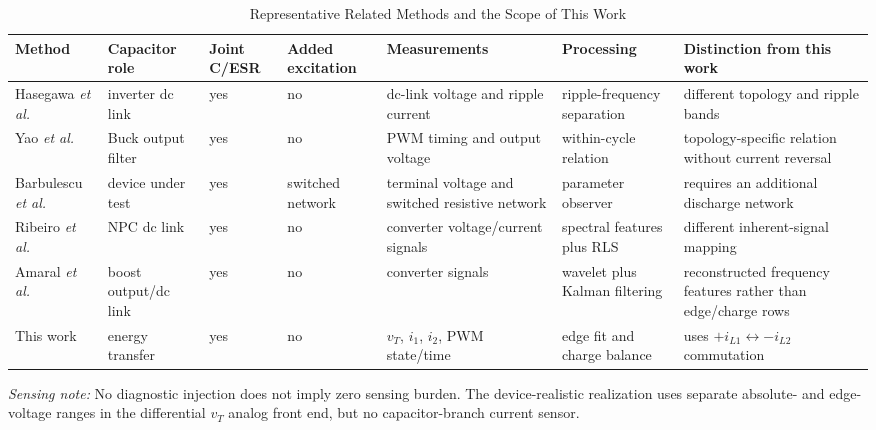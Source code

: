 \begin{table}[t]
\caption{Representative Related Methods and the Scope of This Work}
\label{tab:related_work}
\centering
\footnotesize
\setlength{\tabcolsep}{3pt}
\begin{tabular}{p{2.15cm}p{1.45cm}p{1.0cm}p{1.55cm}p{2.45cm}p{1.95cm}p{4.55cm}}
\toprule
Method & Capacitor role & Joint C/ESR & Added excitation & Measurements & Processing & Distinction from this work \\
\midrule
Hasegawa \emph{et al.} \cite{hasegawa2018dclink} & inverter dc link & yes & no & dc-link voltage and ripple current & ripple-frequency separation & different topology and ripple bands \\ \addlinespace[1pt]
Yao \emph{et al.} \cite{yao2015buck} & Buck output filter & yes & no & PWM timing and output voltage & within-cycle relation & topology-specific relation without \Cuk{} current reversal \\ \addlinespace[1pt]
Barbulescu \emph{et al.} \cite{barbulescu2022observer} & device under test & yes & switched network & terminal voltage and switched resistive network & parameter observer & requires an additional discharge network \\ \addlinespace[1pt]
Ribeiro \emph{et al.} \cite{ribeiro2025inherent} & NPC dc link & yes & no & converter voltage/current signals & spectral features plus RLS & different inherent-signal mapping \\ \addlinespace[1pt]
Amaral \emph{et al.} \cite{amaral2024waveletkf} & boost output/dc link & yes & no & converter signals & wavelet plus Kalman filtering & reconstructed frequency features rather than edge/charge rows \\ \addlinespace[1pt]
This work & \Cuk{} energy transfer & yes & no & $v_T$, $i_1$, $i_2$, PWM state/time & edge fit and charge balance & uses $+i_{L1}\leftrightarrow-i_{L2}$ commutation \\
\bottomrule
\end{tabular}
\vspace{1mm}

\begin{minipage}{0.98\textwidth}
\scriptsize\emph{Sensing note:} No diagnostic injection does not imply zero sensing burden. The device-realistic realization uses separate absolute- and edge-voltage ranges in the differential $v_T$ analog front end, but no capacitor-branch current sensor.
\end{minipage}
\end{table}

